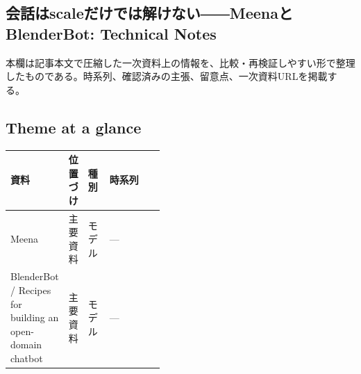 \subsection*{会話はscaleだけでは解けない――MeenaとBlenderBot: Technical Notes}
本欄は記事本文で圧縮した一次資料上の情報を、比較・再検証しやすい形で整理したものである。時系列、確認済みの主張、留意点、一次資料URLを掲載する。
\medskip
\subsection*{Theme at a glance}
\begin{center}
\footnotesize
\begin{tabularx}{\linewidth}{@{}p{0.20\linewidth}p{0.10\linewidth}p{0.14\linewidth}X@{}}
\toprule
資料 & 位置づけ & 種別 & 時系列 \\
\midrule
Meena & 主要資料 & モデル & — \\
BlenderBot / Recipes for building an open-domain chatbot & 主要資料 & モデル & — \\
\bottomrule
\end{tabularx}
\end{center}
\normalsize

